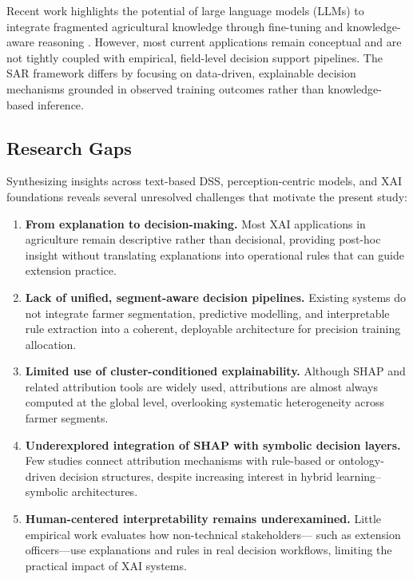 \documentclass[3p,twocolumn,authoryear]{elsarticle}
\begin{document}
Recent work highlights the potential of large language models (LLMs) to integrate fragmented agricultural knowledge through 
fine-tuning and knowledge-aware reasoning \citep{li2025llm}. 
However, most current applications remain conceptual and are not tightly coupled with empirical, 
field-level decision support pipelines. 
The SAR framework differs by focusing on data-driven, explainable decision mechanisms grounded in 
observed training outcomes rather than knowledge-based inference.

\subsection{Research Gaps}

Synthesizing insights across text-based DSS, perception-centric models,
and XAI foundations reveals several unresolved challenges that motivate
the present study:

\begin{enumerate}
  \item \textbf{From explanation to decision-making.}
    Most XAI applications in agriculture remain descriptive rather than
    decisional, providing post-hoc insight without translating
    explanations into operational rules that can guide extension
    practice.

  \item \textbf{Lack of unified, segment-aware decision pipelines.}
    Existing systems do not integrate farmer segmentation, predictive
    modelling, and interpretable rule extraction into a coherent,
    deployable architecture for precision training allocation.

  \item \textbf{Limited use of cluster-conditioned explainability.}
    Although SHAP and related attribution tools are widely used,
    attributions are almost always computed at the global level,
    overlooking systematic heterogeneity across farmer segments.

  \item \textbf{Underexplored integration of SHAP with symbolic
    decision layers.}
    Few studies connect attribution mechanisms with rule-based or
    ontology-driven decision structures, despite increasing interest in
    hybrid learning–symbolic architectures.

  \item \textbf{Human-centered interpretability remains underexamined.}
    Little empirical work evaluates how non-technical stakeholders—
    such as extension officers—use explanations and rules in real
    decision workflows, limiting the practical impact of XAI systems.
\end{enumerate}
\end{document}
